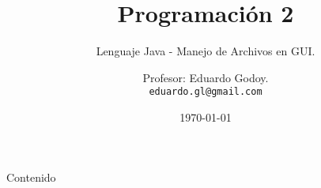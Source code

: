 \documentclass[]{beamer}
\title[Programaci\'on 2]{Programaci\'on 2}
\subtitle{Lenguaje Java - Manejo de Archivos en GUI.}
\date{
	\today}
\author[Eduardo Godoy]{
	Profesor: Eduardo Godoy. \\
	\vspace{0.5mm}
	\texttt{\small eduardo.gl@gmail.com}
}
\institute[Universidad de Valara\'iso]{

	\vspace{0.25cm}
	\texttt Escuela de Ingenier\'ia Civil Inform\'atica.\\
	\texttt Universidad de Valpara\'iso.
}
\begin{document}
\frame{\titlepage}
\section[]{}
\begin{frame}{Contenido}
	\tableofcontents
\end{frame}





%
%

%

\section{}
\end{document}
